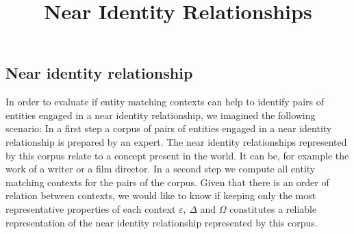 \documentclass[runningheads]{llncs}
\begin{document}
%
\title{Near Identity Relationships}
%
%
%
\maketitle              %
%

%
%
%





\subsection{Near identity relationship}
In order to evaluate if entity matching contexts can help to identify pairs of entities engaged in a near identity relationship, we imagined the following scenario: In a first step a corpus of pairs of entities engaged in a near identity relationship is prepared by an expert. The near identity relationships represented by this corpus relate to a concept present in the world. It can be, for example the work of a writer or a film director. In a second step we compute all entity matching contexts for the pairs of the corpus. Given that there is an order of relation between contexts, we would like to know if keeping only the most representative properties of each context $\varepsilon$, $\Delta$ and $\Omega$ constitutes a reliable representation of the near identity relationship represented by this corpus.
\end{document}
